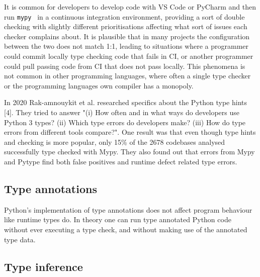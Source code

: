 It is common for developers to develop code with VS Code or PyCharm and then run {\tt mypy } in a continuous integration environment, providing a sort of double checking with slightly different prioritisations affecting what sort of issues each checker complains about. It is plausible that in many projects the configuration between the two does not match 1:1, leading to situations where a programmer could commit locally type checking code that fails in CI, or another programmer could pull passing code from CI that does not pass locally. This phenomena is not common in other programming languages, where often a single type checker or the programming languages own compiler has a monopoly.

In 2020 Rak-amnouykit et al. researched specifics about the Python type hints [4]. They tried to answer "(i) How often and in what ways do developers use Python 3 types? (ii) Which type errors do developers make? (iii) How do type errors from different tools compare?".  One result was that even though type hints and checking is more popular, only 15\% of the 2678 codebases analysed successfully type checked with Mypy. They also found out that errors from Mypy and Pytype find both false positives and runtime defect related type errors.


\subsection{Type annotations}
Python's implementation of type annotations does not affect program behaviour like runtime types do. In theory one can run type annotated Python code without ever executing a type check, and without making use of the annotated type data.


\subsection{Type inference}
